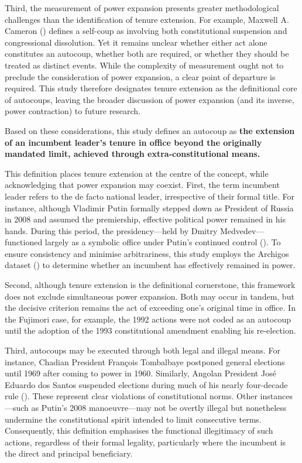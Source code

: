 \documentclass[
  12pt,
]{report}
\begin{document}
Third, the measurement of power expansion presents greater
methodological challenges than the identification of tenure extension.
For example, Maxwell A. Cameron ()
defines a self-coup as involving both constitutional suspension and
congressional dissolution. Yet it remains unclear whether either act
alone constitutes an autocoup, whether both are required, or whether
they should be treated as distinct events. While the complexity of
measurement ought not to preclude the consideration of power expansion,
a clear point of departure is required. This study therefore designates
tenure extension as the definitional core of autocoups, leaving the
broader discussion of power expansion (and its inverse, power
contraction) to future research.

Based on these considerations, this study defines an autocoup as
\textbf{the extension of an incumbent leader's tenure in office beyond
the originally mandated limit, achieved through extra-constitutional
means.}

This definition places tenure extension at the centre of the concept,
while acknowledging that power expansion may coexist. First, the term
incumbent leader refers to the de facto national leader, irrespective of
their formal title. For instance, although Vladimir Putin formally
stepped down as President of Russia in 2008 and assumed the premiership,
effective political power remained in his hands. During this period, the
presidency---held by Dmitry Medvedev---functioned largely as a symbolic
office under Putin's continued control
(). To ensure consistency and
minimise arbitrariness, this study employs the Archigos dataset
() to
determine whether an incumbent has effectively remained in power.

Second, although tenure extension is the definitional cornerstone, this
framework does not exclude simultaneous power expansion. Both may occur
in tandem, but the decisive criterion remains the act of exceeding one's
original time in office. In the Fujimori case, for example, the 1992
actions were not coded as an autocoup until the adoption of the 1993
constitutional amendment enabling his re-election.

Third, autocoups may be executed through both legal and illegal means.
For instance, Chadian President François Tombalbaye postponed general
elections until 1969 after coming to power in 1960. Similarly, Angolan
President José Eduardo dos Santos suspended elections during much of his
nearly four-decade rule ().
These represent clear violations of constitutional norms. Other
instances---such as Putin's 2008 manoeuvre---may not be overtly illegal
but nonetheless undermine the constitutional spirit intended to limit
consecutive terms. Consequently, this definition emphasises the
functional illegitimacy of such actions, regardless of their formal
legality, particularly where the incumbent is the direct and principal
beneficiary.
\end{document}

